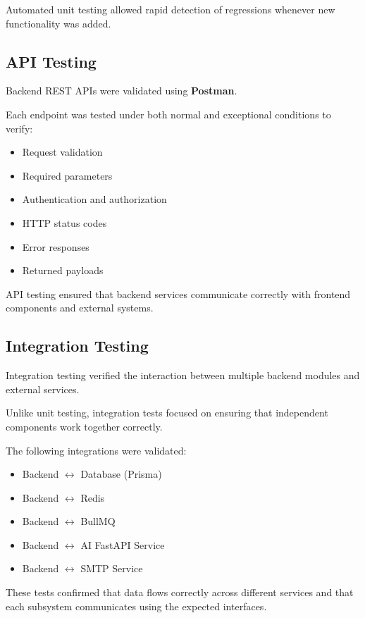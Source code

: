 Automated unit testing allowed rapid detection of regressions whenever new functionality was added.


\subsection{API Testing}

Backend REST APIs were validated using \textbf{Postman}.

Each endpoint was tested under both normal and exceptional conditions to verify:

\begin{itemize}
    \item Request validation
    \item Required parameters
    \item Authentication and authorization
    \item HTTP status codes
    \item Error responses
    \item Returned payloads
\end{itemize}

API testing ensured that backend services communicate correctly with frontend components and external systems.


\subsection{Integration Testing}

Integration testing verified the interaction between multiple backend modules and external services.

Unlike unit testing, integration tests focused on ensuring that independent components work together correctly.

The following integrations were validated:

\begin{itemize}
    \item Backend $\leftrightarrow$ Database (Prisma)
    \item Backend $\leftrightarrow$ Redis
    \item Backend $\leftrightarrow$ BullMQ
    \item Backend $\leftrightarrow$ AI FastAPI Service
    \item Backend $\leftrightarrow$ SMTP Service
\end{itemize}

These tests confirmed that data flows correctly across different services and that each subsystem communicates using the expected interfaces.


